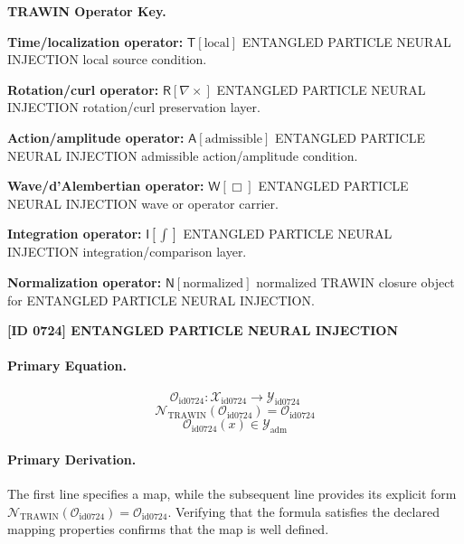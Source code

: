 \par\vspace{0.45\baselineskip}
\noindent\begin{minipage}[t]{\linewidth}
\begingroup
\small
\raggedright
\textbf{TRAWIN Operator Key.}\par
\noindent\textbf{Time/localization operator:} $\mathsf{T}\!\left[\mathrm{local}\right]$ ENTANGLED PARTICLE NEURAL INJECTION local source condition.\par
\noindent\textbf{Rotation/curl operator:} $\mathsf{R}\!\left[\nabla\times\right]$ ENTANGLED PARTICLE NEURAL INJECTION rotation/curl preservation layer.\par
\noindent\textbf{Action/amplitude operator:} $\mathsf{A}\!\left[\mathrm{admissible}\right]$ ENTANGLED PARTICLE NEURAL INJECTION admissible action/amplitude condition.\par
\noindent\textbf{Wave/d'Alembertian operator:} $\mathsf{W}\!\left[\Box\right]$ ENTANGLED PARTICLE NEURAL INJECTION wave or operator carrier.\par
\noindent\textbf{Integration operator:} $\mathsf{I}\!\left[\int\right]$ ENTANGLED PARTICLE NEURAL INJECTION integration/comparison layer.\par
\noindent\textbf{Normalization operator:} $\mathsf{N}\!\left[\mathrm{normalized}\right]$ normalized TRAWIN closure object for ENTANGLED PARTICLE NEURAL INJECTION.\par
\endgroup
\end{minipage}

\clearpage
\noindent\textbf{[ID 0724] ENTANGLED PARTICLE NEURAL INJECTION}\par
\vspace{0.35em}
\paragraph{Primary Equation.}
\[
\mathcal{O}_{\mathrm{id0724}}:\mathcal{X}_{\mathrm{id0724}}\longrightarrow\mathcal{Y}_{\mathrm{id0724}}
\]
\[
\mathcal{N}_{\mathrm{TRAWIN}}(\mathcal{O}_{\mathrm{id0724}})=\mathcal{O}_{\mathrm{id0724}}
\]
\[
\mathcal{O}_{\mathrm{id0724}}(x)\in\mathcal{Y}_{\mathrm{adm}}
\]

\paragraph{Primary Derivation.}
The first line specifies a map, while the subsequent line provides its explicit form \( \mathcal{N}_{\mathrm{TRAWIN}}(\mathcal{O}_{\mathrm{id0724}})=\mathcal{O}_{\mathrm{id0724}} \). Verifying that the formula satisfies the declared mapping properties confirms that the map is well defined.
